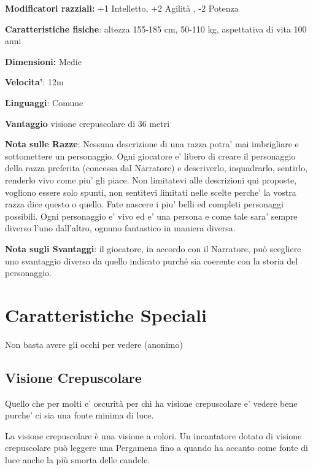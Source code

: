\documentclass[a4paper,11pt,twoside,openany]{book}
\begin{document}
\textbf{Modificatori razziali:} +1 Intelletto, +2 Agilità , -2 Potenza

\textbf{Caratteristiche fisiche}: altezza 155-185 cm, 50-110 kg, aspettativa
di vita 100 anni

\textbf{Dimensioni:} Medie

\textbf{Velocita'}: 12m

\textbf{Linguaggi}: Comune

\textbf{Vantaggio} visione crepuscolare di 36 metri

\bigskip

\textbf{Nota sulle Razze}: Nessuna descrizione di una razza potra' mai imbrigliare e sottomettere un personaggio. Ogni giocatore e' libero di creare il personaggio della razza preferita (concessa dal Narratore) e descriverlo, inquadrarlo, sentirlo, renderlo vivo come piu' gli piace.
Non limitatevi alle descrizioni qui proposte, vogliono essere solo spunti, non sentitevi limitati nelle scelte perche' la vostra razza dice questo o quello.
Fate nascere i piu' belli ed completi personaggi possibili.
Ogni personaggio e' vivo ed e' una persona e come tale sara' sempre diverso l'uno dall'altro, ognuno fantastico in maniera diversa.

\textbf{Nota sugli Svantaggi}: il giocatore, in accordo con il Narratore, può scegliere uno svantaggio diverso da quello indicato purché sia coerente con la storia del personaggio.

\pagebreak

\section{Caratteristiche Speciali}

\label{caratteristiche-speciali}

\begin{tcolorbox}[enhanced,arc=5pt,boxrule=0.3pt]{Non basta avere gli occhi per vedere (anonimo)}\end{tcolorbox}\medskip


\subsection{Visione Crepuscolare}

Quello che per molti e’ oscurità per chi ha visione crepuscolare e’ vedere bene purche’ ci sia una fonte minima di luce.

La visione crepuscolare è una visione a colori.
Un incantatore dotato di visione crepuscolare può leggere una Pergamena fino a quando ha accanto come fonte di luce anche la più smorta delle candele.
\end{document}

